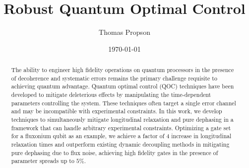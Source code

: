 \documentclass[
  amsfonts,
  amsmath,
  tbtags,
  amssymb,
  aps,
  nobibnotes,
  twocolumn,
]{revtex4-2}
\begin{document}
\title{Robust Quantum Optimal Control}

\author{Thomas Propson}

\date{\today}


\begin{abstract}
  The ability to engineer high fidelity operations on quantum processors in the presence of
  decoherence and systematic errors remains the primary challenge requisite to achieving quantum advantage.
  Quantum optimal control (QOC) techniques have been developed to mitigate deleterious effects
  by manipulating the time-dependent parameters controlling the system. These techniques often
  target a single error channel and may be incompatible with experimental constraints. 
  In this work, we develop techniques to simultaneously mitigate
  longitudinal relaxation and pure dephasing in a framework that can handle arbitrary
  experimental constraints.
  Optimizing a gate set for a fluxonium qubit as an example, we achieve a factor of 4 increase in
  longitudinal relaxation times and outperform
  existing dynamic decoupling methods in mitigating pure dephasing due to flux noise, achieving
  high fidelity gates in the presence of parameter spreads up to $5\%$.
\end{abstract}

\maketitle


\end{document}
